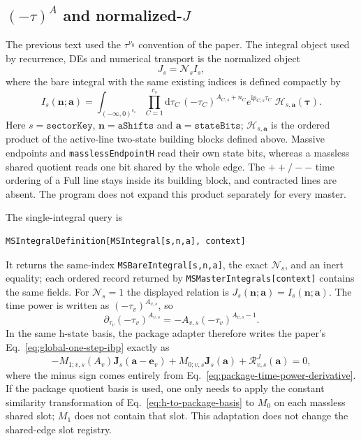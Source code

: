 \documentclass[11pt,a4paper]{article}
\newcommand{\dd}{\mathrm d}
\newcommand{\ii}{\mathrm i}
\newcommand{\cR}{\mathcal R}
\newcommand{\cN}{\mathcal N}
\begin{document}
\subsection{\texorpdfstring{$(-\tau)^A$ and normalized-$J$}{(-tau)A and normalized-J}}

The previous text used the $\tau^{\nu_0}$ convention of the paper. The integral object used by recurrence, DEs and numerical transport is the normalized object
\begin{equation}
 J_s=\cN_sI_s,
\end{equation}
where the bare integral with the same existing indices is defined compactly by
\begin{equation}
 I_s(\bm n;\bm a)=
 \int_{(-\infty,0)^{c_s}}
 \prod_{C=1}^{c_s}\!\dd\tau_C\,
 (-\tau_C)^{A_{C,s}+n_C}e^{\ii p_{C,s}\tau_C}
 \;\mathcal H_{s,\bm a}(\bm\tau).
 \label{eq:package-bare-integral}
\end{equation}
Here $s=\texttt{sectorKey}$, $\bm n=\texttt{aShifts}$ and $\bm a=\texttt{stateBits}$;
$\mathcal H_{s,\bm a}$ is the ordered product of the active-line two-state building blocks defined above.
Massive endpoints and \texttt{masslessEndpointH} read their own state bits, whereas a massless shared quotient reads one bit shared by the whole edge. The $++/--$ time ordering of a Full line stays inside its building block, and contracted lines are absent. The program does not expand this product separately for every master.

The single-integral query is
\begin{verbatim}
MSIntegralDefinition[MSIntegral[s,n,a], context]
\end{verbatim}
It returns the same-index \texttt{MSBareIntegral[s,n,a]}, the exact $\cN_s$, and an inert equality;
each ordered record returned by \texttt{MSMasterIntegrals[context]} contains the same fields.
For $\cN_s=1$ the displayed relation is $J_s(\bm n;\bm a)=I_s(\bm n;\bm a)$.
The time power is written as $(-\tau_v)^{A_{v,s}}$, so
\begin{equation}
 \partial_{\tau_v}(-\tau_v)^{A_{v,s}}
 =-A_{v,s}(-\tau_v)^{A_{v,s}-1}.
 \label{eq:package-time-power-derivative}
\end{equation}
In the same h-state basis, the package adapter therefore writes the paper's Eq.~\eqref{eq:global-one-step-ibp} exactly as
\begin{equation}
 -M_{1;v,s}(A_v)\bm J_s(\bm a-\bm e_v)
 +M_{0;v,s}\bm J_s(\bm a)
 +\cR^{J}_{v,s}(\bm a)=0,
 \label{eq:package-one-step-ibp}
\end{equation}
where the minus sign comes entirely from Eq.~\eqref{eq:package-time-power-derivative}. If the package quotient basis is used, one only needs to apply the constant similarity transformation of Eq.~\eqref{eq:h-to-package-basis} to $M_0$ on each massless shared slot; $M_1$ does not contain that slot. This adaptation does not change the shared-edge slot registry.
\end{document}
